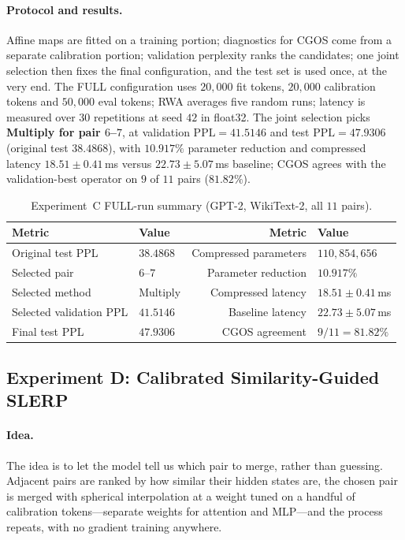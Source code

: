 \documentclass[10pt,a4paper]{article}
\begin{document}
\paragraph{Protocol and results.} Affine maps are fitted on a training portion;
diagnostics for CGOS come from a separate calibration portion; validation
perplexity ranks the candidates; one joint selection then fixes the final
configuration, and the test set is used once, at the very end. The FULL
configuration uses $20{,}000$ fit tokens, $20{,}000$ calibration tokens and
$50{,}000$ eval tokens; RWA averages five random runs; latency is measured over
$30$ repetitions at seed $42$ in float32. The joint selection picks
\textbf{Multiply for pair $6$--$7$}, at validation $\mathrm{PPL}=41.5146$ and
test $\mathrm{PPL}=47.9306$ (original test $38.4868$), with $10.917\%$ parameter
reduction and compressed latency $18.51\pm0.41$\,ms versus $22.73\pm5.07$\,ms
baseline; CGOS agrees with the validation-best operator on $9$ of $11$ pairs
($81.82\%$).

\begin{table}[t]
\centering
\small
\begin{tabular}{llrl}
\toprule
Metric & Value & Metric & Value \\
\midrule
Original test PPL & $38.4868$ & Compressed parameters & $110{,}854{,}656$ \\
Selected pair & $6$--$7$ & Parameter reduction & $10.917\%$ \\
Selected method & Multiply & Compressed latency & $18.51\pm0.41$\,ms \\
Selected validation PPL & $41.5146$ & Baseline latency & $22.73\pm5.07$\,ms \\
Final test PPL & $47.9306$ & CGOS agreement & $9/11 = 81.82\%$ \\
\bottomrule
\end{tabular}
\caption{Experiment~C FULL-run summary (GPT-2, WikiText-2, all $11$ pairs).}
\label{tab:lingala}
\end{table}

\subsection{Experiment D: Calibrated Similarity-Guided SLERP}
\label{sec:expD}

\paragraph{Idea.} The idea is to let the model tell us which pair to merge,
rather than guessing. Adjacent pairs are ranked by how similar their hidden
states are, the chosen pair is merged with spherical interpolation at a weight
tuned on a handful of calibration tokens---separate weights for attention and
MLP---and the process repeats, with no gradient training anywhere.
\end{document}
